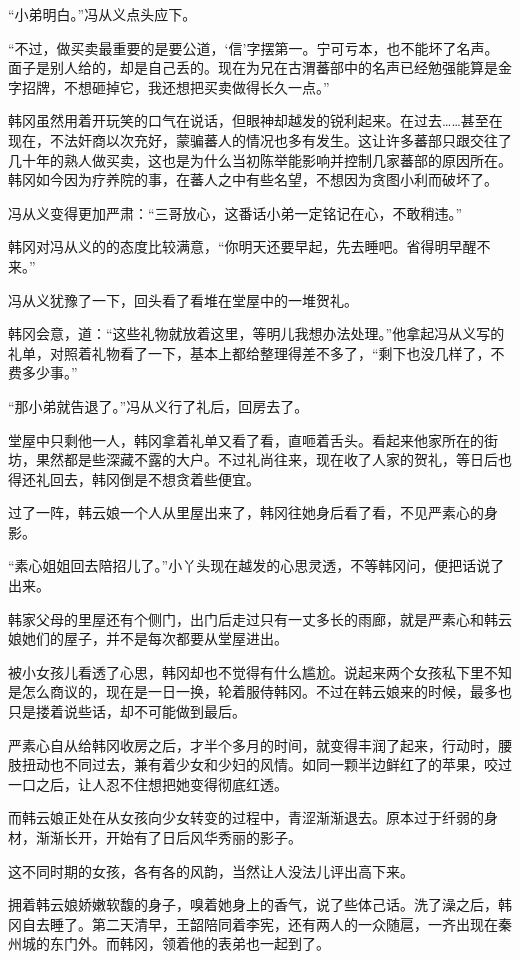 “小弟明白。”冯从义点头应下。

“不过，做买卖最重要的是要公道，‘信’字摆第一。宁可亏本，也不能坏了名声。面子是别人给的，却是自己丢的。现在为兄在古渭蕃部中的名声已经勉强能算是金字招牌，不想砸掉它，我还想把买卖做得长久一点。”

韩冈虽然用着开玩笑的口气在说话，但眼神却越发的锐利起来。在过去……甚至在现在，不法奸商以次充好，蒙骗蕃人的情况也多有发生。这让许多蕃部只跟交往了几十年的熟人做买卖，这也是为什么当初陈举能影响并控制几家蕃部的原因所在。韩冈如今因为疗养院的事，在蕃人之中有些名望，不想因为贪图小利而破坏了。

冯从义变得更加严肃：“三哥放心，这番话小弟一定铭记在心，不敢稍违。”

韩冈对冯从义的的态度比较满意，“你明天还要早起，先去睡吧。省得明早醒不来。”

冯从义犹豫了一下，回头看了看堆在堂屋中的一堆贺礼。

韩冈会意，道：“这些礼物就放着这里，等明儿我想办法处理。”他拿起冯从义写的礼单，对照着礼物看了一下，基本上都给整理得差不多了，“剩下也没几样了，不费多少事。”

“那小弟就告退了。”冯从义行了礼后，回房去了。

堂屋中只剩他一人，韩冈拿着礼单又看了看，直咂着舌头。看起来他家所在的街坊，果然都是些深藏不露的大户。不过礼尚往来，现在收了人家的贺礼，等日后也得还礼回去，韩冈倒是不想贪着些便宜。

过了一阵，韩云娘一个人从里屋出来了，韩冈往她身后看了看，不见严素心的身影。

“素心姐姐回去陪招儿了。”小丫头现在越发的心思灵透，不等韩冈问，便把话说了出来。

韩家父母的里屋还有个侧门，出门后走过只有一丈多长的雨廊，就是严素心和韩云娘她们的屋子，并不是每次都要从堂屋进出。

被小女孩儿看透了心思，韩冈却也不觉得有什么尴尬。说起来两个女孩私下里不知是怎么商议的，现在是一日一换，轮着服侍韩冈。不过在韩云娘来的时候，最多也只是搂着说些话，却不可能做到最后。

严素心自从给韩冈收房之后，才半个多月的时间，就变得丰润了起来，行动时，腰肢扭动也不同过去，兼有着少女和少妇的风情。如同一颗半边鲜红了的苹果，咬过一口之后，让人忍不住想把她变得彻底红透。

而韩云娘正处在从女孩向少女转变的过程中，青涩渐渐退去。原本过于纤弱的身材，渐渐长开，开始有了日后风华秀丽的影子。

这不同时期的女孩，各有各的风韵，当然让人没法儿评出高下来。

拥着韩云娘娇嫩软馥的身子，嗅着她身上的香气，说了些体己话。洗了澡之后，韩冈自去睡了。第二天清早，王韶陪同着李宪，还有两人的一众随扈，一齐出现在秦州城的东门外。而韩冈，领着他的表弟也一起到了。

